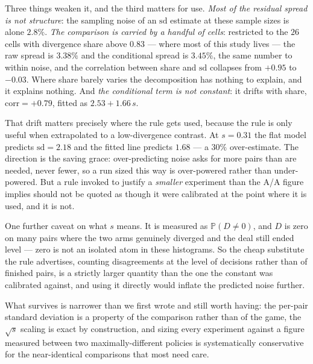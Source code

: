 \documentclass[11pt,a4paper]{article}
\newcommand{\Prob}{\ensuremath{\mathbb{P}}}
\begin{document}
Three things weaken it, and the third matters for use. \emph{Most of the
residual spread is not structure}: the sampling noise of an $\mathrm{sd}$
estimate at these sample sizes is alone $2.8\%$. \emph{The comparison is carried
by a handful of cells}: restricted to the $26$ cells with divergence share above
$0.83$ --- where most of this study lives --- the raw spread is $3.38\%$ and the
conditional spread is $3.45\%$, the same number to within noise, and the
correlation between share and $\mathrm{sd}$ collapses from $+0.95$ to $-0.03$.
Where share barely varies the decomposition has nothing to explain, and it
explains nothing. And \emph{the conditional term is not constant}: it drifts
with share, $\mathrm{corr} = +0.79$, fitted as $2.53 + 1.66\,s$.

That drift matters precisely where the rule gets used, because the rule is only
useful when extrapolated to a low-divergence contrast. At $s = 0.31$ the flat
model predicts $\mathrm{sd} = 2.18$ and the fitted line predicts $1.68$ --- a
$30\%$ over-estimate. The direction is the saving grace: over-predicting noise
asks for more pairs than are needed, never fewer, so a run sized this way is
over-powered rather than under-powered. But a rule invoked to justify a
\emph{smaller} experiment than the A/A figure implies should not be quoted as
though it were calibrated at the point where it is used, and it is not.

One further caveat on what $s$ means. It is measured as $\Prob(D \neq 0)$, and
$D$ is zero on many pairs where the two arms genuinely diverged and the deal
still ended level --- zero is not an isolated atom in these histograms. So the
cheap substitute the rule advertises, counting disagreements at the level of
decisions rather than of finished pairs, is a strictly larger quantity than the
one the constant was calibrated against, and using it directly would inflate the
predicted noise further.

What survives is narrower than we first wrote and still worth having: the
per-pair standard deviation is a property of the comparison rather than of the
game, the $\sqrt{s}$ scaling is exact by construction, and sizing every
experiment against a figure measured between two maximally-different policies is
systematically conservative for the near-identical comparisons that most need
care.

\label{sec:eval-sd}
\end{document}
